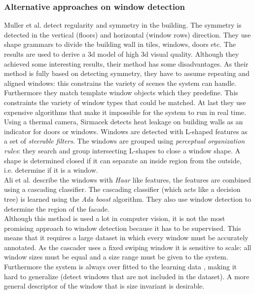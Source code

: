 \subsubsection{Alternative approaches on window detection}
Muller et al. \cite{Muller_procedural} detect regularity and symmetry in the building. The
symmetry is detected in the vertical (floors) and horizontal (window
rows) direction.
They use shape grammars to divide the building wall in tiles, windows, doors etc.
The results are used to derive a 3d model of high 3d visual quality.
Although they achieved some interesting results, their method has some
disadvantages.  As their method is fully based on detecting symmetry, they have
to assume repeating and aligned windows: this constrains the variety of scenes
the system can handle.
Furthermore they match template window objects which they predefine. This 
constraints the variety of window types that could be matched.  At last 
they use expensive algorithms that make it impossible for the system
to run in real time.  \\

Using a thermal camera, Sirmacek \cite{Sirmacek_thermal}
detects heat leakage on building walls as an indicator for doors or windows.
Windows are detected with L-shaped features as a set of \emph{steerable filters}.
The windows are grouped using \emph{perceptual organization rules}:
they search and group intersecting L-shapes to close a window shape. A shape is
determined closed if it can separate an inside region from the outside, i.e.
determine if it is a window.  \\

Ali et al. \cite{Ali_facades} describe the windows with \emph{Haar} like
features, the features are combined using a cascading classifier. The cascading
classifier (which acts like a decision tree) is learned using the \emph{Ada
boost} algorithm.  They also use window detection to determine the region of
the facade.\\

Although this method is used a lot in computer vision, it is not the most
promising approach to window detection because it has to be supervised.  This means
that it requires a large dataset in which every window must be accurately
annotated.  As the cascader uses a fixed swiping window it is sensitive to
scale: all window sizes must be equal and a size range must be given to the system.
Furthermore the system is always over fitted to the learning data
, making it hard to generalize (detect windows that are
not included in the dataset).  A more general descriptor of the window that is
size invariant is desirable.\\

